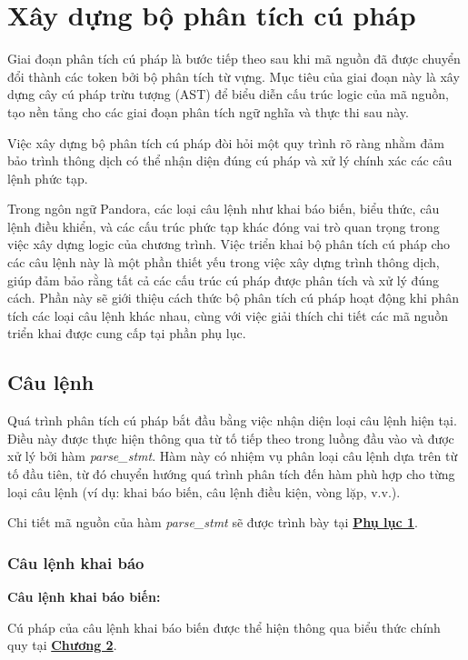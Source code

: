 \section{Xây dựng bộ phân tích cú pháp}
\label{ch3:syntax-analysis}
Giai đoạn phân tích cú pháp là bước tiếp theo sau khi mã nguồn đã được chuyển đổi thành các token bởi bộ phân tích từ vựng. Mục tiêu của giai đoạn này là xây dựng cây cú pháp trừu tượng (AST) để biểu diễn cấu trúc logic của mã nguồn, tạo nền tảng cho các giai đoạn phân tích ngữ nghĩa và thực thi sau này. 

Việc xây dựng bộ phân tích cú pháp đòi hỏi một quy trình rõ ràng nhằm đảm bảo trình thông dịch có thể nhận diện đúng cú pháp và xử lý chính xác các câu lệnh phức tạp.

Trong ngôn ngữ Pandora, các loại câu lệnh như khai báo biến, biểu thức, câu lệnh điều khiển, và các cấu trúc phức tạp khác đóng vai trò quan trọng trong việc xây dựng logic của chương trình. Việc triển khai bộ phân tích cú pháp cho các câu lệnh này là một phần thiết yếu trong việc xây dựng trình thông dịch, giúp đảm bảo rằng tất cả các cấu trúc cú pháp được phân tích và xử lý đúng cách. Phần này sẽ giới thiệu cách thức bộ phân tích cú pháp hoạt động khi phân tích các loại câu lệnh khác nhau, cùng với việc giải thích chi tiết các mã nguồn triển khai được cung cấp tại phần phụ lục.

\subsection{Câu lệnh}
Quá trình phân tích cú pháp bắt đầu bằng việc nhận diện loại câu lệnh hiện tại. Điều này được thực hiện thông qua từ tố tiếp theo trong luồng đầu vào và được xử lý bởi hàm \textit{parse\_stmt}. Hàm này có nhiệm vụ phân loại câu lệnh dựa trên từ tố đầu tiên, từ đó chuyển hướng quá trình phân tích đến hàm phù hợp cho từng loại câu lệnh (ví dụ: khai báo biến, câu lệnh điều kiện, vòng lặp, v.v.).

Chi tiết mã nguồn của hàm \textit{parse\_stmt} sẽ được trình bày tại \hyperref[ap1:stmt]{\bf Phụ lục 1}. %


\subsubsection{Câu lệnh khai báo}

\noindent\textbf{Câu lệnh khai báo biến:}

Cú pháp của câu lệnh khai báo biến được thể hiện thông qua biểu thức chính quy tại \hyperref[ch2:decl_var_stmt]{\bf Chương 2}.

